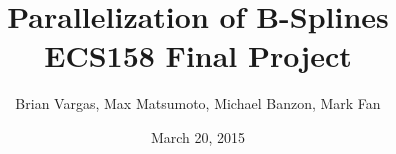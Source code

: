 \documentclass{article}
\title{Parallelization of B-Splines \\ ECS158 Final Project}
\author{Brian Vargas, Max Matsumoto, Michael Banzon, Mark Fan}
\date{March 20, 2015}
\begin{document}
\maketitle
\newtheorem{mydef}{Definition}





\appendix


\end{document}
